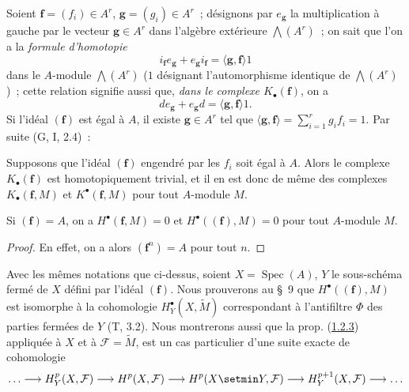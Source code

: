 \begin{env}[1.1.7]
\label{III.1.1.7-fr}
Soient $\mathbf f=(f_i)\in A^r$, $\mathbf g=(g_i)\in A^r$~; désignons par
$e_{\mathbf g}$ la multiplication à gauche par le vecteur
$\mathbf g\in A^r$ dans l'algèbre extérieure $\bigwedge(A^r)$~; on sait que
l'on a la \emph{formule d'homotopie}
\begin{equation}
\label{III.1.1.7.1-fr}
\tag{1.1.7.1}
i_{\mathbf f}e_{\mathbf g}+e_{\mathbf g}i_{\mathbf f}
=\langle\mathbf g,\mathbf f\rangle 1
\end{equation}
dans le $A$-module $\bigwedge(A^r)$ ($1$ désignant l'automorphisme identique de
$\bigwedge(A^r)$)~;
cette relation signifie aussi que, \emph{dans le complexe
$K_\bullet(\mathbf f)$}, on a
\begin{equation}
\label{III.1.1.7.2-fr}
\tag{1.1.7.2}
de_{\mathbf g}+e_{\mathbf g}d=\langle\mathbf g,\mathbf f\rangle 1.
\end{equation}
Si l'idéal $(\mathbf f)$ est égal à $A$, il existe $\mathbf g\in A^r$ tel que
$\langle\mathbf g,\mathbf f\rangle=\sum_{i=1}^r g_if_i=1$. Par suite
(G, I, 2.4)~:
\end{env}

\begin{proposition}[1.1.8]
\label{III.1.1.8-fr}
Supposons que l'idéal $(\mathbf f)$ engendré par les $f_i$ soit égal à $A$.
Alors le complexe $K_\bullet(\mathbf f)$ est homotopiquement trivial, et il en
est donc de même des complexes $K_\bullet(\mathbf f,M)$ et
$K^\bullet(\mathbf f,M)$ pour tout $A$-module $M$.
\end{proposition}

\begin{corollary}[1.1.9]
\label{III.1.1.9-fr}
Si $(\mathbf f)=A$, on a $H^\bullet(\mathbf f,M)=0$ et
$H^\bullet((\mathbf f),M)=0$ pour tout $A$-module $M$.
\end{corollary}

\begin{proof}
En effet, on a alors $(\mathbf f^n)=A$ pour tout $n$.
\end{proof}

\begin{remark}[1.1.10]
\label{III.1.1.10-fr}
Avec les mêmes notations que ci-dessus, soient $X=\operatorname{Spec}(A)$,
$Y$ le sous-schéma fermé de $X$ défini par l'idéal $(\mathbf f)$. Nous
prouverons au \S~9 que $H^\bullet((\mathbf f),M)$ est isomorphe à la
cohomologie $H_Y^\bullet(X,\widetilde M)$ correspondant à l'antifiltre $\Phi$
des parties fermées de $Y$ (T, 3.2). Nous montrerons aussi que la prop.
(\hyperref[III.1.2.3-fr]{1.2.3}) appliquée à $X$ et à
$\mathcal F=\widetilde M$, est un cas particulier d'une suite exacte de
cohomologie
\[
\ldots\longrightarrow H_Y^p(X,\mathcal F)\longrightarrow H^p(X,\mathcal F)
\longrightarrow H^p(X\setmin Y,\mathcal F)\longrightarrow H_Y^{p+1}(X,\mathcal F)
\longrightarrow\ldots
\]
\end{remark}

